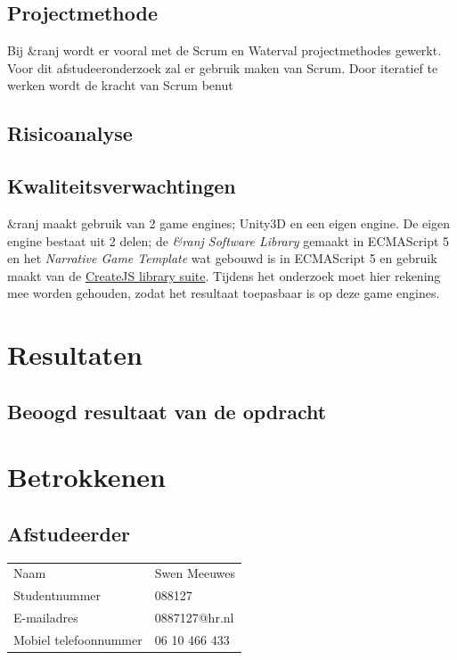 \documentclass{report}
\makeatletter
\newcommand{\name}{Swen Meeuwes}
\newcommand{\studentnumber}{088127}
\newcommand{\email}{0887127@hr.nl}
\newcommand{\mobilephone}{06 10 466 433}
\newcommand{\organisation}{\&ranj }
\makeatother
\begin{document}
\section{Projectmethode}
Bij \organisation wordt er vooral met de Scrum en Waterval projectmethodes gewerkt. Voor dit afstudeeronderzoek zal er gebruik maken van Scrum. Door iteratief te werken wordt de kracht van Scrum benut


\section{Risicoanalyse}

\section{Kwaliteitsverwachtingen}
\organisation maakt gebruik van 2 game engines; Unity3D en een eigen engine. De eigen engine bestaat uit 2 delen; de \emph{\organisation Software Library} gemaakt in ECMAScript 5 en het \emph{Narrative Game Template} wat gebouwd is in ECMAScript 5 en gebruik maakt van de \href{https://createjs.com/}{CreateJS library suite}. Tijdens het onderzoek moet hier rekening mee worden gehouden, zodat het resultaat toepasbaar is op deze game engines.

\chapter{Resultaten}

\section{Beoogd resultaat van de opdracht}


\renewcommand{\bibname}{Literatuur}

\nocite{*}

\chapter{Betrokkenen}

\section*{Afstudeerder}
\begin{table}[h]
\begin{tabular}{ll}
Naam & \name \\
Studentnummer & \studentnumber \\
E-mailadres & \email \\
Mobiel telefoonnummer & \mobilephone
\end{tabular}
\end{table}
\end{document}
